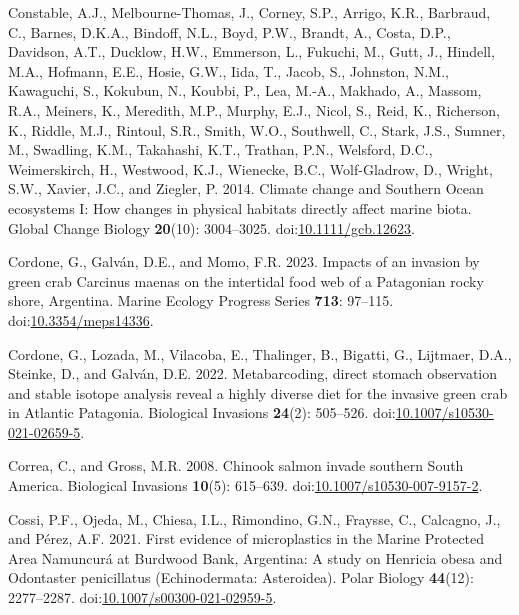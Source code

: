 \documentclass[
]{article}
\newlength{\cslhangindent}
\newenvironment{CSLReferences}[2] %
 {\begin{list}{}{%
  \setlength{\itemindent}{0pt}
  \setlength{\leftmargin}{0pt}
  \setlength{\parsep}{0pt}
  \ifodd #1
   \setlength{\leftmargin}{\cslhangindent}
   \setlength{\itemindent}{-1\cslhangindent}
  \fi
  \setlength{\itemsep}{#2\baselineskip}}}
 {\end{list}}
\begin{document}
\begin{CSLReferences}{1}{0}
Constable, A.J., Melbourne-Thomas, J., Corney, S.P., Arrigo, K.R.,
Barbraud, C., Barnes, D.K.A., Bindoff, N.L., Boyd, P.W., Brandt, A.,
Costa, D.P., Davidson, A.T., Ducklow, H.W., Emmerson, L., Fukuchi, M.,
Gutt, J., Hindell, M.A., Hofmann, E.E., Hosie, G.W., Iida, T., Jacob,
S., Johnston, N.M., Kawaguchi, S., Kokubun, N., Koubbi, P., Lea, M.-A.,
Makhado, A., Massom, R.A., Meiners, K., Meredith, M.P., Murphy, E.J.,
Nicol, S., Reid, K., Richerson, K., Riddle, M.J., Rintoul, S.R., Smith,
W.O., Southwell, C., Stark, J.S., Sumner, M., Swadling, K.M., Takahashi,
K.T., Trathan, P.N., Welsford, D.C., Weimerskirch, H., Westwood, K.J.,
Wienecke, B.C., Wolf-Gladrow, D., Wright, S.W., Xavier, J.C., and
Ziegler, P. 2014. Climate change and {Southern Ocean} ecosystems {I}:
How changes in physical habitats directly affect marine biota. Global
Change Biology \textbf{20}(10): 3004--3025.
doi:\href{https://doi.org/10.1111/gcb.12623}{10.1111/gcb.12623}.

Cordone, G., Galván, D.E., and Momo, F.R. 2023. Impacts of an invasion
by green crab {Carcinus} maenas on the intertidal food web of a
{Patagonian} rocky shore, {Argentina}. Marine Ecology Progress Series
\textbf{713}: 97--115.
doi:\href{https://doi.org/10.3354/meps14336}{10.3354/meps14336}.

Cordone, G., Lozada, M., Vilacoba, E., Thalinger, B., Bigatti, G.,
Lijtmaer, D.A., Steinke, D., and Galván, D.E. 2022. Metabarcoding,
direct stomach observation and stable isotope analysis reveal a highly
diverse diet for the invasive green crab in {Atlantic Patagonia}.
Biological Invasions \textbf{24}(2): 505--526.
doi:\href{https://doi.org/10.1007/s10530-021-02659-5}{10.1007/s10530-021-02659-5}.

Correa, C., and Gross, M.R. 2008. Chinook salmon invade southern {South
America}. Biological Invasions \textbf{10}(5): 615--639.
doi:\href{https://doi.org/10.1007/s10530-007-9157-2}{10.1007/s10530-007-9157-2}.

Cossi, P.F., Ojeda, M., Chiesa, I.L., Rimondino, G.N., Fraysse, C.,
Calcagno, J., and Pérez, A.F. 2021. First evidence of microplastics in
the {Marine Protected Area Namuncur{á}} at {Burdwood Bank}, {Argentina}:
A study on {Henricia} obesa and {Odontaster} penicillatus
({Echinodermata}: {Asteroidea}). Polar Biology \textbf{44}(12):
2277--2287.
doi:\href{https://doi.org/10.1007/s00300-021-02959-5}{10.1007/s00300-021-02959-5}.


\end{CSLReferences}
\end{document}

